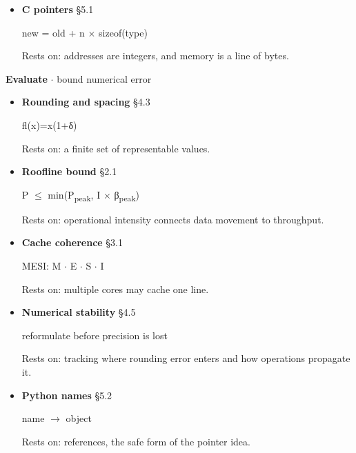 \documentclass[11pt]{article}
\begin{document}
\begin{keepsection}
\begin{itemize}
(\ensuremath{-}1)\textsuperscript{S} \ensuremath{\times} significand \ensuremath{\times} 2\textsuperscript{E}

Rests on: sign, biased exponent, and finite precision.
\item {}
\textbf{C pointers} \hfill{\small\color{FAUblue}§5.1}

new = old + n \ensuremath{\times} sizeof(type)

Rests on: addresses are integers, and memory is a line of bytes.
\end{itemize}

\textbf{Evaluate} \ensuremath{\cdot} bound numerical error

\begin{itemize}
\item {}
\textbf{Rounding and spacing} \hfill{\small\color{FAUblue}§4.3}

fl(x)=x(1+δ)

Rests on: a finite set of representable values.
\item {}
\textbf{Roofline bound} \hfill{\small\color{FAUblue}§2.1}

P \ensuremath{\leq} min(P\textsubscript{peak}, I \ensuremath{\times} β\textsubscript{peak})

Rests on: operational intensity connects data movement to throughput.
\item {}
\textbf{Cache coherence} \hfill{\small\color{FAUblue}§3.1}

MESI: M \ensuremath{\cdot} E \ensuremath{\cdot} S \ensuremath{\cdot} I

Rests on: multiple cores may cache one line.
\item {}
\textbf{Numerical stability} \hfill{\small\color{FAUblue}§4.5}

reformulate before precision is lost

Rests on: tracking where rounding error enters and how operations propagate it.
\item {}
\textbf{Python names} \hfill{\small\color{FAUblue}§5.2}

name \ensuremath{\to} object

Rests on: references, the safe form of the pointer idea.
\end{itemize}


\end{keepsection}
\end{document}
